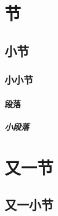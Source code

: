 \documentclass{ctexart}
\begin{document}
\section{节}
\lipsum[1-2]
\subsection{小节}
\lipsum[3-4]
\subsubsection{小小节}
\lipsum[5-6]
\paragraph{段落}
\lipsum[7-8]
\subparagraph{小段落}
\section{又一节}
\lipsum[9-10]
\subsection{又一小节}
\end{document}
